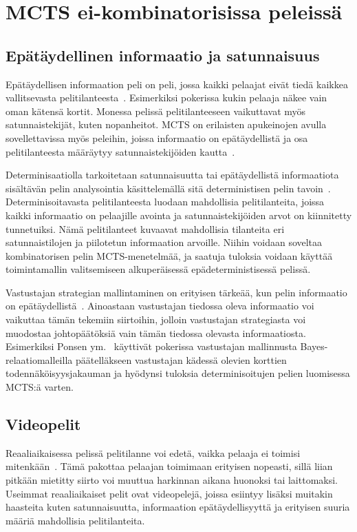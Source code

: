 \documentclass[12pt,finnish]{tktltiki2}
\theoremstyle{definition}
\theoremstyle{remark}
\begin{document}
\section{MCTS ei-kombinatorisissa peleissä}

\subsection{Epätäydellinen informaatio ja satunnaisuus}

Epätäydellisen informaation peli on peli, jossa kaikki pelaajat eivät tiedä kaikkea vallitsevasta pelitilanteesta~\cite{browne}. Esimerkiksi pokerissa kukin pelaaja näkee vain oman kätensä kortit. Monessa pelissä pelitilanteeseen vaikuttavat myös satunnaistekijät, kuten nopanheitot. MCTS on erilaisten apukeinojen avulla sovellettavissa myös peleihin, joissa informaatio on epätäydellistä ja osa pelitilanteesta määräytyy satunnaistekijöiden kautta~\cite{browne}.

Determinisaatiolla tarkoitetaan satunnaisuutta tai epätäydellistä informaatiota sisältävän pelin analysointia käsittelemällä sitä deterministisen pelin tavoin~\cite{browne}. Determinisoitavasta pelitilanteesta luodaan mahdollisia pelitilanteita, joissa kaikki informaatio on pelaajille avointa ja satunnaistekijöiden arvot on kiinnitetty tunnetuiksi. Nämä pelitilanteet kuvaavat mahdollisia tilanteita eri satunnaistilojen ja piilotetun informaation arvoille. Niihin voidaan soveltaa kombinatorisen pelin MCTS-menetelmää, ja saatuja tuloksia voidaan käyttää toimintamallin valitsemiseen alkuperäisessä epädeterministisessä pelissä.

Vastustajan strategian mallintaminen on erityisen tärkeää, kun pelin informaatio on epätäydellistä~\cite{browne}. Ainoastaan vastustajan tiedossa oleva informaatio voi vaikuttaa tämän tekemiin siirtoihin, jolloin vastustajan strategiasta voi muodostaa johtopäätöksiä vain tämän tiedossa olevasta informaatiosta. Esimerkiksi Ponsen ym.~\cite{ponsen} käyttivät pokerissa vastustajan mallinnusta Bayes-relaatiomalleilla päätelläkseen vastustajan kädessä olevien korttien todennäköisyysjakauman ja hyödynsi tuloksia determinisoitujen pelien luomisessa MCTS:ä varten.

\subsection{Videopelit}

Reaaliaikaisessa pelissä pelitilanne voi edetä, vaikka pelaaja ei toimisi mitenkään~\cite{browne}. Tämä pakottaa pelaajan toimimaan erityisen nopeasti, sillä liian pitkään mietitty siirto voi muuttua harkinnan aikana huonoksi tai laittomaksi. Useimmat reaaliaikaiset pelit ovat videopelejä, joissa esiintyy lisäksi muitakin haasteita kuten satunnaisuutta, informaation epätäydellisyyttä ja erityisen suuria määriä mahdollisia pelitilanteita.
\end{document}
